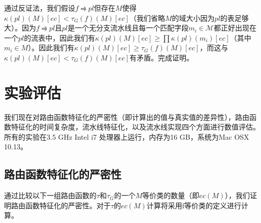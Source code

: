 通过反证法，我们假设$f \rightrightharpoons pl$但存在$M$使得$\kappa(pl)(M)[ec] < \tau_G(f)(M)[ec]$（我们省略$M$的域大小因为$pl$的表足够大）。因为$f \rightrightharpoons pl$且$pl$是一个无分支流水线且每一个匹配字段$m_i \in \mathcal{M}$都正好出现在一个$pl$的流表中，因此我们有$\kappa(pl)(M)[ec] \ge \prod \kappa(pl)(m_i)[ec]$（其中$m_i \in M$）。因此我们有$\kappa(pl)(M)[ec] \ge \tau_G(f)(M)[ec]$，而这与$\kappa(pl)(M)[ec] < \tau_G(f)(M)[ec]$有矛盾。完成证明。




\section{实验评估}

我们现在对路由函数特征化的严密性（即计算出的值与真实值的差异性），路由函数特征化的时间复杂度，流水线特征化，以及流水线实现四个方面进行数值评估。所有的实验在3.5 GHz Intel i7 处理器上运行，内存为16 GB，系统为Mac OSX 10.13。


\subsection{路由函数特征化的严密性}
\label{sec:eval1}

通过比较以下一组路由函数的$\tau$和$\tau_G$的一个$M$等价类的数量（即$ec(M)$），我们证明路由函数特征化的严密性。对于$\tau$的$ec(M)$计算将采用f等价类的定义进行计算。


